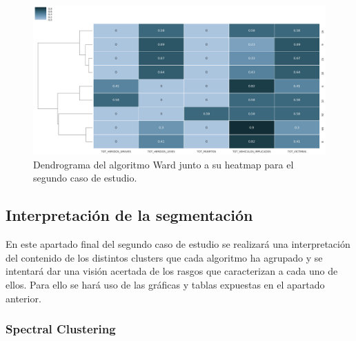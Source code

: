 	\begin{figure}[H]
		\centering
		\includegraphics[scale=0.4]{dendrograms/Ward-EarlyMorningAccidents-Dendrogram.png}
		\caption{Dendrograma del algoritmo Ward junto a su heatmap para el segundo caso de estudio.}
	\end{figure}
	
	\subsection{Interpretación de la segmentación}
	En este apartado final del segundo caso de estudio se realizará una interpretación del contenido de los distintos clusters que cada algoritmo ha agrupado y se intentará dar una visión acertada de los rasgos que caracterizan a cada uno de ellos. Para ello se hará uso de las gráficas y tablas expuestas en el apartado anterior.
	
	\subsubsection{Spectral Clustering}
	
	
